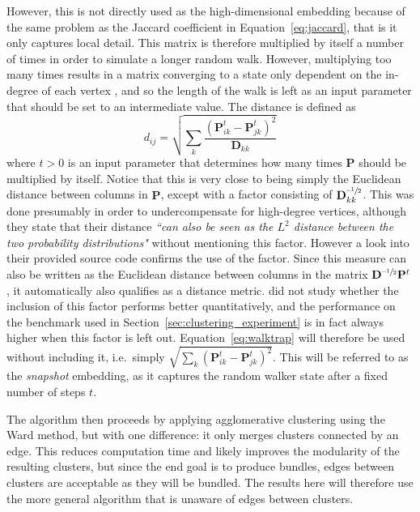 However, this is not directly used as the high-dimensional embedding because of the same problem as the Jaccard coefficient in Equation~\eqref{eq:jaccard}, that is it only captures local detail. This matrix is therefore multiplied by itself a number of times in order to simulate a longer random walk. However, multiplying too many times results in a matrix converging to a state only dependent on the in-degree of each vertex \cite{Pons2006}, and so the length of the walk is left as an input parameter that should be set to an intermediate value.
The distance is defined as
\begin{equation}
  d_{ij} = \sqrt{\sum_{k}\frac{(\mathbf{P}_{ik}^t - \mathbf{P}_{jk}^t)^2}{\mathbf{D}_{kk}}}
  \label{eq:walktrap}
\end{equation}
where $t>0$ is an input parameter that determines how many times $\mathbf{P}$ should be multiplied by itself.
Notice that this is very close to being simply the Euclidean distance between columns in $\mathbf{P}$, except with a factor consisting of $\mathbf{D}_{kk}^{\text{--}\sfrac{1}{2}}$. This was done presumably in order to undercompensate for high-degree vertices, although they state that their distance \textit{``can also be seen as the $L^2$ distance between the two probability distributions"} \cite{Pons2006} without mentioning this factor. However a look into their provided source code confirms the use of the factor.
Since this measure can also be written as the Euclidean distance between columns in the matrix $\mathbf{D}^{\text{--}\sfrac{1}{2}}\mathbf{P}^t$, it automatically also qualifies as a distance metric.
\cite{Pons2006} did not study whether the inclusion of this factor performs better quantitatively, and the performance on the benchmark used in Section~\ref{sec:clustering_experiment} is in fact always higher when this factor is left out. Equation~\eqref{eq:walktrap} will therefore be used without including it, i.e.\ simply $\sqrt{\sum_{k}(\mathbf{P}_{ik}^t - \mathbf{P}_{jk}^t)^2}$. This will be referred to as the \emph{snapshot} embedding, as it captures the random walker state after a fixed number of steps $t$.

The algorithm then proceeds by applying agglomerative clustering using the Ward method, but with one difference: it only merges clusters connected by an edge. This reduces computation time and likely improves the modularity of the resulting clusters, but since the end goal is to produce bundles, edges between clusters are acceptable as they will be bundled. The results here will therefore use the more general algorithm that is unaware of edges between clusters.

